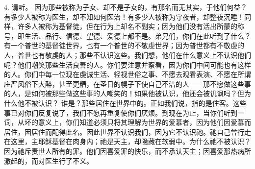 4. 请听。  因为那些被称为子女、却不是子女的，有那名而无其实，于他们何益？有多少人被称为医生，却不知如何医治！有多少人被称为守夜者，却整夜沉睡！同样，许多人被称为基督徒，但在行为上却名不副实；因为他们没有活出所蒙的称号，即生活、品行、信德、望德、爱德上都不是。弟兄们，你们在此听到了什么？ 有一个普世的基督徒世界，也有一个普世的不敬虔世界；因为普世都有不敬虔的人，普世也有敬虔的人；那些不认识这些。我们想，他们在什么意义上不认识他们呢？他们嘲笑那些生活良善的人。你们要注意并察看，因为你们中间可能也有这样的人。你们中每一位现在虔诚生活、轻视世俗之事、不愿去观看表演、不愿在所谓庄严风俗下大醉，甚至更糟，在圣日的幌子下使自己不洁的人——那不愿做这些事的人，是如何被那些做这些事的人嘲笑的！如果他被认识，他还会被讥讽吗？但为什么他不被认识？ 谁是？那些居住在世界中的。正如我们说，指的是住客。这些事已对你们反复说了，我们不愿再重复使你们厌烦。到现在为止，当你们听到一词，从坏的意义上，你们知道必须只将其理解为世界的爱慕者，因为他们因爱慕而居住，因居住而配得此名。因此世界不认识我们，因为它不认识祂。祂自己曾行走在这里，主耶稣基督在肉身内；祂是天主，却隐藏在软弱中。为什么祂不被认识？因为祂斥责世人所有的罪。他们因喜爱罪的快乐，而不承认天主；因喜爱那热病所激起的，而对医生行了不义。\par

